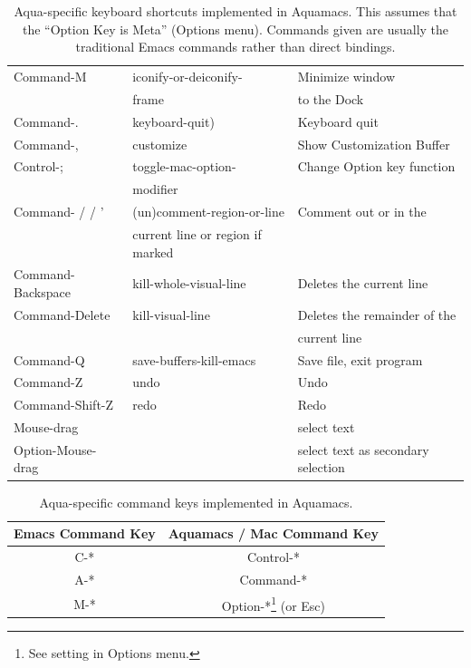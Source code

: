 \documentclass[11pt,letterpaper]{article}
\begin{document}
\begin{table}[thp]
\begin{center}
\begin{tabular}{|l|l|l|}
\hline Command-M & iconify-or-deiconify- & Minimize window \\ & frame &  to the Dock\\

\hline Command-. & keyboard-quit) & Keyboard quit\\

\hline Command-, & customize & Show Customization Buffer\\

\hline Control-; & toggle-mac-option- & Change Option key function\\ & modifier &\\

\hline Command-{ / } / '& (un)comment-region-or-line & Comment out or in the \\ & current line or region if 
marked  &\\

\hline Command-Backspace & kill-whole-visual-line & Deletes the current line \\
\hline Command-Delete & kill-visual-line & Deletes the remainder of the
\\ & & current line \\

\hline Command-Q & save-buffers-kill-emacs & Save file, exit program\\

\hline Command-Z & undo & Undo\\

\hline Command-Shift-Z &  redo & Redo\\

\hline Mouse-drag & & select text \\
\hline Option-Mouse-drag & & select text as secondary selection \\

\hline 
\end{tabular} 
\caption{Aqua-specific keyboard shortcuts implemented in
  Aquamacs. This assumes that the ``Option Key is Meta'' (Options menu).  Commands given are usually the traditional Emacs commands rather than direct bindings.}
\label{tab:shortcuts}
\end{center}
\end{table}


\begin{table}[htp]
\begin{center}
 \begin{tabular}{|c|c|}
\hline \textbf{Emacs Command Key} & \textbf{Aquamacs / Mac Command Key}\\
\hline C-* & Control-*\\
\hline A-* & Command-*\\
\hline M-* & Option-*\footnote{See setting in Options menu.}
(or Esc)\\
\hline 
\end{tabular} 
\caption{Aqua-specific command keys implemented in Aquamacs.}
\label{tab:command}
\end{center}
\end{table}
\end{document}

